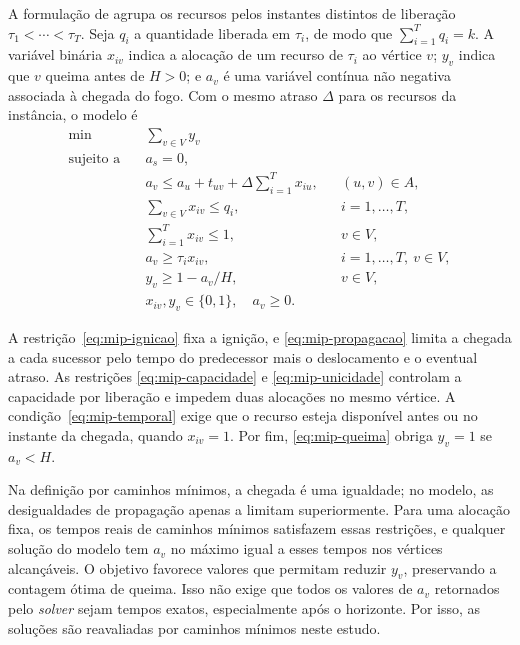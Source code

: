 A formulação de  agrupa os recursos pelos
instantes distintos de liberação $\tau_1<\cdots<\tau_T$. Seja $q_i$ a
quantidade liberada em $\tau_i$, de modo que $\sum_{i=1}^{T}q_i=k$.
A variável binária $x_{iv}$ indica a alocação de um recurso de $\tau_i$
ao vértice $v$; $y_v$ indica que $v$ queima antes de $H>0$; e $a_v$ é
uma variável contínua não negativa associada à chegada do fogo. Com o
mesmo atraso $\Delta$ para os recursos da instância, o modelo é
\begin{align}
 \min\quad &\sum_{v\in V}y_v \label{eq:mip-objetivo}\\
 \text{sujeito a}\quad &a_s=0, \label{eq:mip-ignicao}\\
 &a_v\leq a_u+t_{uv}+\Delta\sum_{i=1}^{T}x_{iu},
       &&(u,v)\in A, \label{eq:mip-propagacao}\\
 &\sum_{v\in V}x_{iv}\leq q_i,
       &&i=1,\ldots,T, \label{eq:mip-capacidade}\\
 &\sum_{i=1}^{T}x_{iv}\leq1,
       &&v\in V, \label{eq:mip-unicidade}\\
 &a_v\geq\tau_i x_{iv},
       &&i=1,\ldots,T,\ v\in V, \label{eq:mip-temporal}\\
 &y_v\geq1-a_v/H,
       &&v\in V, \label{eq:mip-queima}\\
 &x_{iv},y_v\in\{0,1\},\quad a_v\geq0.
       \label{eq:mip-dominios}
\end{align}

A restrição~\eqref{eq:mip-ignicao} fixa a ignição, e
\eqref{eq:mip-propagacao} limita a chegada a cada sucessor pelo tempo
do predecessor mais o deslocamento e o eventual atraso. As restrições
\eqref{eq:mip-capacidade} e \eqref{eq:mip-unicidade} controlam a
capacidade por liberação e impedem duas alocações no mesmo vértice.
A condição~\eqref{eq:mip-temporal} exige que o recurso esteja disponível
antes ou no instante da chegada, quando $x_{iv}=1$.
Por fim, \eqref{eq:mip-queima} obriga $y_v=1$ se $a_v<H$.

Na definição por caminhos mínimos, a chegada é uma igualdade; no modelo,
as desigualdades de propagação apenas a limitam superiormente. Para uma
alocação fixa, os tempos reais de caminhos mínimos satisfazem essas
restrições, e qualquer solução do modelo tem $a_v$ no máximo igual a
esses tempos nos vértices alcançáveis. O objetivo favorece valores que
permitam reduzir $y_v$, preservando a contagem ótima de queima.
Isso não exige que todos os valores de $a_v$ retornados pelo
\textit{solver} sejam tempos exatos, especialmente após o horizonte.
Por isso, as soluções são reavaliadas por caminhos mínimos neste estudo.

